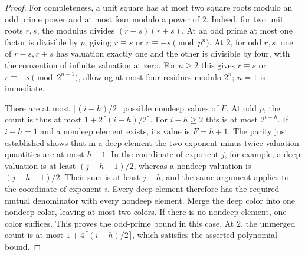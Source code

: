 \begin{proof}
For completeness, a unit square has at most two square roots modulo
an odd prime power and at most four modulo a power of \(2\).
Indeed, for two unit roots \(r,s\), the modulus divides
\((r-s)(r+s)\). At an odd prime at most one factor is divisible by
\(p\), giving \(r\equiv s\) or \(r\equiv-s\pmod{p^n}\). At \(2\),
for odd \(r,s\), one of \(r-s,r+s\) has valuation exactly one and
the other is divisible by four, with the convention of infinite
valuation at zero. For \(n\ge2\) this gives
\(r\equiv s\) or \(r\equiv-s\pmod{2^{n-1}}\), allowing at most four
residues modulo \(2^n\); \(n=1\) is immediate.

There are at most \(\lceil(i-h)/2\rceil\) possible nondeep values of
\(F\). At odd \(p\), the count is thus at most
\(1+2\lceil(i-h)/2\rceil\). For \(i-h\ge2\) this is at most
\(2^{i-h}\). If \(i-h=1\) and a nondeep element exists, its value
is \(F=h+1\). The parity just established shows that in a deep
element the two exponent-minus-twice-valuation quantities are at
most \(h-1\). In the coordinate of exponent \(j\), for example,
a deep valuation is at least \((j-h+1)/2\), whereas a nondeep
valuation is \((j-h-1)/2\). Their sum is at least \(j-h\), and
the same argument applies to the coordinate of exponent \(i\).
Every deep element therefore has the required mutual denominator
with every nondeep element. Merge the deep color into one nondeep
color, leaving at most two colors. If there is no nondeep element,
one color suffices. This proves the odd-prime bound in this case.
At \(2\), the unmerged count is at most
\(1+4\lceil(i-h)/2\rceil\), which satisfies the asserted
polynomial bound.


\end{proof}
